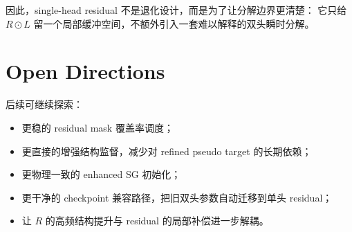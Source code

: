 \documentclass[11pt]{article}
\begin{document}
因此，single-head residual 不是退化设计，而是为了让分解边界更清楚：
它只给 $R \odot L$ 留一个局部缓冲空间，不额外引入一套难以解释的双头瞬时分解。

\section{Open Directions}

后续可继续探索：
\begin{itemize}[leftmargin=1.5em]
    \item 更稳的 residual mask 覆盖率调度；
    \item 更直接的增强结构监督，减少对 refined pseudo target 的长期依赖；
    \item 更物理一致的 enhanced SG 初始化；
    \item 更干净的 checkpoint 兼容路径，把旧双头参数自动迁移到单头 residual；
    \item 让 $R$ 的高频结构提升与 residual 的局部补偿进一步解耦。
\end{itemize}
\end{document}
